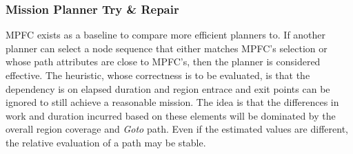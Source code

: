 \documentclass{tamuccthesis}
\begin{document}


\subsubsection{Mission Planner Try \& Repair}

MPFC exists as a baseline to compare more efficient planners to. If another planner can select a node sequence that either matches MPFC's selection or whose path attributes are close to MPFC's, then the planner is considered effective. The heuristic, whose correctness is to be evaluated, is that the dependency is on elapsed duration and region entrace and exit points can be ignored to still achieve a reasonable mission. The idea is that the differences in work and duration incurred based on these elements will be dominated by the overall region coverage and \textit{Goto} path. Even if the estimated values are different, the relative evaluation of a path may be stable. 
\end{document}
